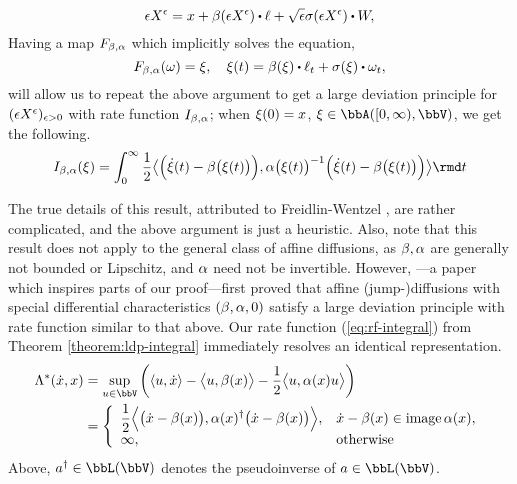 \begin{example}[Diffusions]
  \begin{equation}
    \label{eq:F-brownian-drift-diff}
    \Xe = \stateVar + \affDrift(\Xe) \shortInt \leb + \sqrt\epsilon \affDiffSqrt(\Xe) \shortInt \W,
  \end{equation}
  Having a map $F_{\beta,\alpha}$ which implicitly solves the equation,
  \begin{equation*}
    F_{\affDrift,\affDiff}(\omega) = \pathVar, \quad \pathVar(t) = \affDrift(\pathVar) \shortInt \leb_t + \affDiffSqrt(\pathVar) \shortInt \omega_t,
  \end{equation*}
  will allow us to repeat the above argument to get a large deviation principle for $(\epsilon X^\epsilon)_{\epsilon>0}$ with rate function $I_{\beta,\alpha}$; when $\xi(0) = x$, $\pathVar \in \acpathSpace{[0,\infty)}{\vecSpace}$, we get the following.
  \begin{equation*}
    \rf_{\affDrift,\affDiff}(\pathVar) = \int_0^\infty \frac12 \bprj{\Big(\dot\pathVar(t)-\affDrift\big(\pathVar(t)\big)\Big)}{\affDiff\big(\pathVar(t)\big)^{-1}\Big(\dot\pathVar(t)-\affDrift\big(\pathVar(t)\big)\Big)} \rmd t
  \end{equation*}

  The true details of this result, attributed to Freidlin-Wentzel \cite[Theorems 5.6.3 and 5.6.7]{dembo2010}, are rather complicated, and the above argument is just a heuristic.
  Also, note that this result does not apply to the general class of affine diffusions, as $\beta, \alpha$ are generally not bounded or Lipschitz, and $\alpha$ need not be invertible.
  However, \cite{kang2014}---a paper which inspires parts of our proof---first proved that affine (jump-)diffusions with special differential characteristics $(\beta, \alpha, 0)$ satisfy a large deviation principle with rate function similar to that above.
  Our rate function (\ref{eq:rf-integral}) from Theorem \ref{theorem:ldp-integral} immediately resolves an identical representation.
  \begin{align*}
    \ode^*(\diffVar, \stateVar)
    &= \sup_{\momentVar \in \vecSpace} \bigg( \prj{\momentVar}{\diffVar} - \bprj{\momentVar}{\affDrift(\stateVar)} - \frac12\bprj{\momentVar}{\affDiff(\stateVar)\momentVar} \bigg) \\
    &= \left\{\begin{array}{ll}
      \displaystyle \frac12\Bprj{\big(\diffVar-\affDrift(\stateVar)\big)}{\affDiff(\stateVar)^\dagger\big(\diffVar-\affDrift(\stateVar)\big)}, & \diffVar - \affDrift(\stateVar) \in \operatorname{image}\affDiff(\stateVar), \\
      \infty, & \text{otherwise}
    \end{array}\right.
  \end{align*}
  Above, $a^\dagger \in \bbL(\vecSpace)$ denotes the pseudoinverse of $a \in \bbL(\vecSpace)$.
\end{example}
